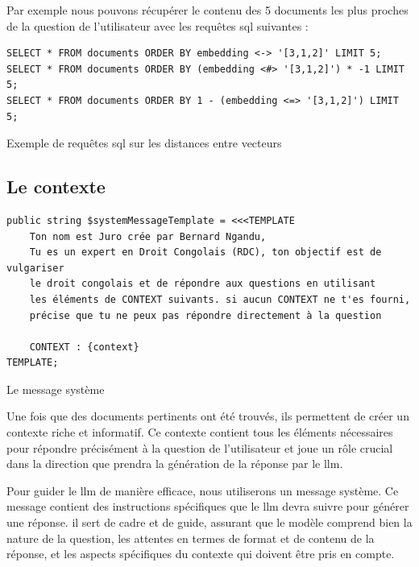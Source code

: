 Par exemple nous pouvons récupérer le contenu des 5 documents les plus proches de la question de l'utilisateur avec les requêtes \ac{sql} suivantes : 

\hspace{1pt}
\begin{listing}[!ht]
\begin{verbatim}
SELECT * FROM documents ORDER BY embedding <-> '[3,1,2]' LIMIT 5;
SELECT * FROM documents ORDER BY (embedding <#> '[3,1,2]') * -1 LIMIT 5;
SELECT * FROM documents ORDER BY 1 - (embedding <=> '[3,1,2]') LIMIT 5;
\end{verbatim}
\caption{Exemple de requêtes \ac{sql} sur les distances entre vecteurs}
\label{appendix:code:sql:embeddings-distances}
\end{listing}

\subsection{Le contexte}

\begin{listing}[!ht]
\begin{verbatim}
public string $systemMessageTemplate = <<<TEMPLATE
    Ton nom est Juro crée par Bernard Ngandu, 
    Tu es un expert en Droit Congolais (RDC), ton objectif est de vulgariser 
    le droit congolais et de répondre aux questions en utilisant 
    les éléments de CONTEXT suivants. si aucun CONTEXT ne t'es fourni, 
    précise que tu ne peux pas répondre directement à la question

    CONTEXT : {context}
TEMPLATE;
\end{verbatim}
\caption{Le message système}
\label{appendix:code:php:system-message-template}
\end{listing}

Une fois que des documents pertinents ont été trouvés, ils permettent de créer un contexte riche et informatif. Ce contexte contient tous les éléments nécessaires pour répondre précisément à la question de l'utilisateur et joue un rôle crucial dans la direction que prendra la génération de la réponse par le \ac{llm}.

Pour guider le \ac{llm} de manière efficace, nous utiliserons un message système. Ce message contient des instructions spécifiques que le \ac{llm} devra suivre pour générer une réponse. il sert de cadre et de guide, assurant que le modèle comprend bien la nature de la question, les attentes en termes de format et de contenu de la réponse, et les aspects spécifiques du contexte qui doivent être pris en compte.



